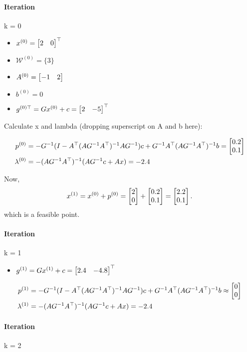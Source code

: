 \paragraph{Iteration} k = 0

\begin{itemize}
  \item $x^{(0)} = \begin{bmatrix} 2 & 0 \end{bmatrix}^{\top}$
  \item $\mathcal{W}^{(0)} = \{3\}$
  \item $A^{(0)} = \begin{bmatrix} -1 & 2 \end{bmatrix}$
  \item $b^{(0)} = 0$
  \item $g^{(0)\top} = Gx^{(0)} + c = \begin{bmatrix} 2 & -5 \end{bmatrix}^{\top}$
\end{itemize}

Calculate x and lambda (dropping superscript on A and b here):

\begin{align*}
  p^{(0)} &= -G^{-1}(I - A^{\top}(AG^{-1}A^{\top})^{-1}AG^{-1})c + G^{-1}A^{\top}(AG^{-1}A^{\top})^{-1}b = \begin{bmatrix} 0.2 \\ 0.1 \end{bmatrix}  \\ 
  \lambda^{(0)} &= -(AG^{-1}A^{\top})^{-1}(AG^{-1}c + Ax) = -2.4
\end{align*}

Now,
\[
  x^{(1)} = x^{(0)} + p^{(0)} = \begin{bmatrix} 2 \\ 0 \end{bmatrix} + \begin{bmatrix} 0.2 \\ 0.1 \end{bmatrix} = \begin{bmatrix} 2.2 \\ 0.1 \end{bmatrix}
  .\] 
  which is a feasible point. 
  
  \paragraph{Iteration} k = 1
  \begin{itemize}
    \item $g^{(1)} = Gx^{(1)} + c = \begin{bmatrix} 2.4 & -4.8 \end{bmatrix}^{\top}$
  \end{itemize}
  
  \begin{align*}
    p^{(1)} &= -G^{-1}(I - A^{\top}(AG^{-1}A^{\top})^{-1}AG^{-1})c + G^{-1}A^{\top}(AG^{-1}A^{\top})^{-1}b \approx \begin{bmatrix} 0 \\ 0 \end{bmatrix}  \\ 
    \lambda^{(1)} &= -(AG^{-1}A^{\top})^{-1}(AG^{-1}c + Ax) = -2.4
  \end{align*}
  
  \paragraph{Iteration} k = 2
  
